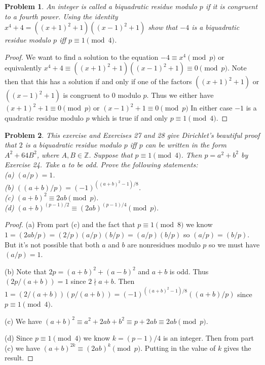 \documentclass{article}
\newtheorem{problem}{Problem}
\begin{document}
\begin{problem}
An integer is called a biquadratic residue modulo $p$ if it is congruent to a fourth power. Using the identity $x^4 + 4 = ((x+1)^2 + 1)((x-1)^2 + 1)$ show that $-4$ is a biquadratic residue modulo $p$ iff $p \equiv 1 \pmod{4}$.
\end{problem}
\begin{proof}
We want to find a solution to the equation $-4 \equiv x^4 \pmod{p}$ or equivalently $x^4 + 4 \equiv ((x+1)^2 + 1)((x-1)^2 + 1) \equiv 0 \pmod{p}$. Note then that this has a solution if and only if one of the factors $((x+1)^2+1)$ or $((x-1)^2+1)$ is congruent to $0$ modulo $p$. Thus we either have $(x+1)^2+1 \equiv 0 \pmod{p}$ or $(x-1)^2+1 \equiv 0 \pmod{p}$ In either case $-1$ is a quadratic residue modulo $p$ which is true if and only $p \equiv 1 \pmod{4}$.
\end{proof}

\begin{problem}
\label{parts}
This exercise and Exercises 27 and 28 give Dirichlet's beautiful proof that $2$ is a biquadratic residue modulo $p$ iff $p$ can be written in the form $A^2 + 64B^2$, where $A, B \in \mathbb{Z}$. Suppose that $p \equiv 1 \pmod{4}$. Then $p = a^2 + b^2$ by Exercise 24. Take $a$ to be odd. Prove the following statements:\\
(a) $(a/p) = 1$.\\
(b) $((a+b)/p) = (-1)^{((a+b)^2-1)/8}$.\\
(c) $(a+b)^2 \equiv 2ab \pmod{p}$.\\
(d) $(a+b)^{(p-1)/2} \equiv (2ab)^{(p-1)/4} \pmod{p}$.
\end{problem}
\begin{proof}
(a) From part (c) and the fact that $p \equiv 1 \pmod{8}$ we know $1 = (2ab/p) = (2/p)(a/p)(b/p) = (a/p)(b/p)$ so $(a/p) = (b/p)$. But it's not possible that both $a$ and $b$ are nonresidues modulo $p$ so we must have $(a/p) = 1$.

(b) Note that $2p = (a+b)^2 + (a-b)^2$ and $a+b$ is odd. Thus $(2p/(a+b)) = 1$ since $2 \nmid a+b$. Then $1 = (2/(a+b)) (p/(a+b)) = (-1)^{((a+b)^2-1)/8} ((a+b)/p)$ since $p \equiv 1 \pmod{4}$.

(c) We have $(a+b)^2 \equiv a^2 + 2ab + b^2 \equiv p + 2ab \equiv 2ab \pmod{p}$.

(d) Since $p \equiv 1 \pmod{4}$ we know $k = (p-1)/4$ is an integer. Then from part (c) we have $(a+b)^{2k} \equiv (2ab)^k \pmod{p}$. Putting in the value of $k$ gives the result.
\end{proof}
\end{document}
